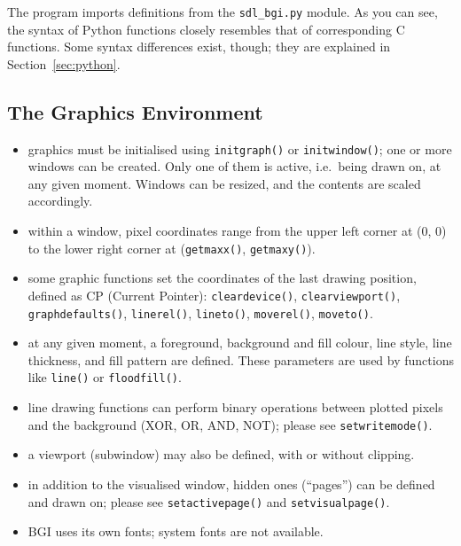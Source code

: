 \documentclass[a4paper,12pt]{article}
\newcommand{\ntt}[1]{\texttt{#1}}
\newcommand{\fn}[1]{\ntt{#1}}        %
\newcommand{\F}[1]{\ntt{#1}}         %
\begin{document}
The program imports definitions from the \F{sdl\_bgi.py} module. As
you can see, the syntax of Python functions closely resembles that of
corresponding C functions. Some syntax differences exist, though; they
are explained in Section~\ref{sec:python}.


\subsection{The Graphics Environment}

\begin{itemize}

\item graphics must be initialised using \fn{initgraph()} or
\fn{initwindow()}; one or more windows can be created. Only one of
them is active, i.e.\ being drawn on, at any given moment. Windows
can be resized, and the contents are scaled accordingly.

\item within a window, pixel coordinates range from the upper left
corner at (0, 0) to the lower right corner at (\fn{get\-maxx()},
\fn{getmaxy()}).

\item some graphic functions set the coordinates of the last drawing
position, defined as CP (Current Pointer): \fn{cleardevice()},
\fn{clearviewport()}, \fn{graphdefaults()}, \fn{linerel()},
\fn{lineto()}, \fn{moverel()}, \fn{moveto()}.

\item at any given moment, a foreground, background and fill colour,
line style, line thickness, and fill pattern are defined. These
parameters are used by functions like \fn{line()} or \fn{floodfill()}.

\item line drawing functions can perform binary operations between
plotted pixels and the background (XOR, OR, AND, NOT); please see
\fn{setwritemode()}.

\item a viewport (subwindow) may also be defined, with or without
clipping.

\item in addition to the visualised window, hidden ones (``pages'')
can be defined and drawn on; please see \fn{setactivepage()} and
\fn{setvisualpage()}.

\item BGI uses its own fonts; system fonts are not available.

\end{itemize}
\end{document}
